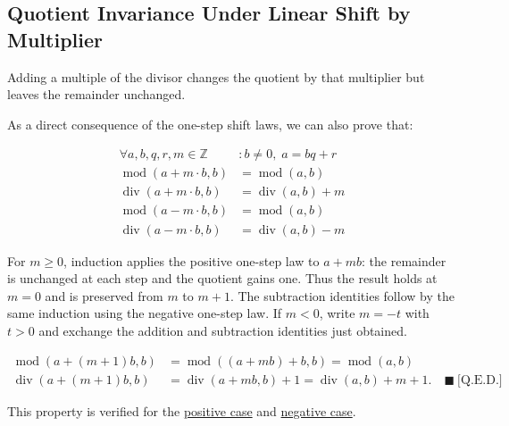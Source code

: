 \subsection{Quotient Invariance Under Linear Shift by Multiplier}
\label{sec:linear-shift-multiplier}

Adding a multiple of the divisor changes the quotient by that multiplier but
leaves the remainder unchanged.

As a direct consequence of the one-step shift laws, we can also prove that:

\begin{equation*}
\begin{aligned}
\forall a,b,q,r,m \in \mathbb{Z} &: b \neq 0,\; a = bq + r \\
\operatorname{mod}(a + m \cdot b, b) &= \operatorname{mod}(a, b) \\
\operatorname{div}(a + m \cdot b, b) &= \operatorname{div}(a, b) + m \\
\operatorname{mod}(a - m \cdot b, b) &= \operatorname{mod}(a, b) \\
\operatorname{div}(a - m \cdot b, b) &= \operatorname{div}(a, b) - m
\end{aligned}
\end{equation*}

For $m\geq0$, induction applies the positive one-step law to $a+m b$: the
remainder is unchanged at each step and the quotient gains one. Thus the
result holds at $m=0$ and is preserved from $m$ to $m+1$. The subtraction
identities follow by the same induction using the negative one-step law.
If $m<0$, write $m=-t$ with $t>0$ and exchange the addition and subtraction
identities just obtained.

\begin{equation*}
\begin{aligned}
\operatorname{mod}(a+(m+1)b,b)
  &= \operatorname{mod}((a+mb)+b,b) = \operatorname{mod}(a,b) \\
\operatorname{div}(a+(m+1)b,b)
  &= \operatorname{div}(a+mb,b)+1 = \operatorname{div}(a,b)+m+1.
  \quad \blacksquare\ \text{[Q.E.D.]}
\end{aligned}
\end{equation*}

This property is verified for the
\href{https://github.com/thiagomata/prime-numbers/blob/modulo-article-v1.0.0/src/main/scala/v1/chapter2/div/properties/AdditionAndMultiplication.scala#APlusMultipleTimesBSameMod}{positive case}
and
\href{https://github.com/thiagomata/prime-numbers/blob/modulo-article-v1.0.0/src/main/scala/v1/chapter2/div/properties/AdditionAndMultiplication.scala#ALessMultipleTimesBSameMod}{negative case}.

